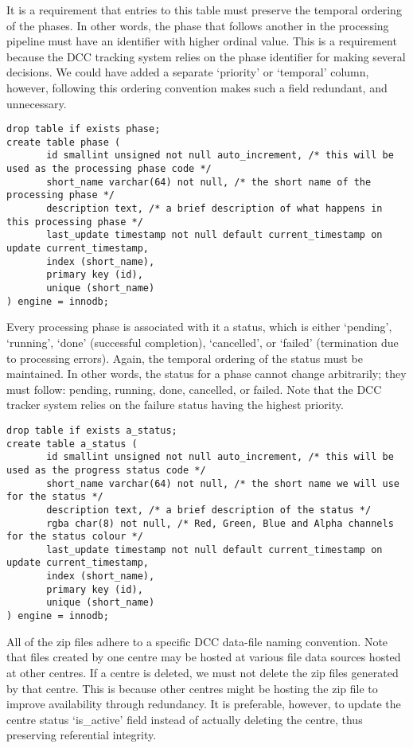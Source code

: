 \documentclass[a4paper,11pt]{article}
\begin{document}
\begin{landscape}
It is a requirement that entries to this table must preserve the temporal ordering of the phases. In other words, the phase that follows another in the processing pipeline must have an identifier with higher ordinal value. This is a requirement because the DCC tracking system relies on the phase identifier for making several decisions. We could have added a separate `priority' or `temporal' column, however, following this ordering convention makes such a field redundant, and unnecessary.

\begin{Verbatim}[fontsize=\small,formatcom=\color{blue}]
drop table if exists phase;
create table phase (
       id smallint unsigned not null auto_increment, /* this will be used as the processing phase code */
       short_name varchar(64) not null, /* the short name of the processing phase */
       description text, /* a brief description of what happens in this processing phase */
       last_update timestamp not null default current_timestamp on update current_timestamp,
       index (short_name),
       primary key (id),
       unique (short_name)
) engine = innodb;
\end{Verbatim}

Every processing phase is associated with it a status, which is either `pending', `running', `done' (successful completion), `cancelled', or `failed' (termination due to processing errors). Again, the temporal ordering of the status must be maintained. In other words, the status for a phase cannot change arbitrarily; they must follow: pending, running, done, cancelled, or failed. Note that the DCC tracker system relies on the failure status having the highest priority.

\begin{Verbatim}[fontsize=\small,formatcom=\color{blue}]
drop table if exists a_status;
create table a_status (
       id smallint unsigned not null auto_increment, /* this will be used as the progress status code */
       short_name varchar(64) not null, /* the short name we will use for the status */
       description text, /* a brief description of the status */
       rgba char(8) not null, /* Red, Green, Blue and Alpha channels for the status colour */
       last_update timestamp not null default current_timestamp on update current_timestamp,
       index (short_name),
       primary key (id),
       unique (short_name)
) engine = innodb;
\end{Verbatim}

All of the zip files adhere to a specific DCC data-file naming convention. Note that files created by one centre may be hosted at various file data sources hosted at other centres. If a centre is deleted, we must not delete the zip files generated by that centre. This is because other centres might be hosting the zip file to improve availability through redundancy. It is preferable, however, to update the centre status `is\_active' field instead of actually deleting the centre, thus preserving referential integrity.


\end{landscape}
\end{document}
